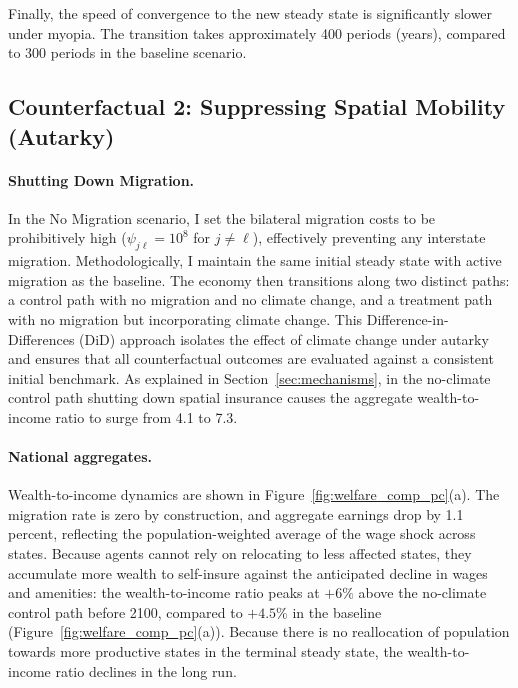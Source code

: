 \documentclass[11pt, a4paper]{article}
\begin{document}
Finally, the speed of convergence to the new steady state is significantly slower under myopia. The transition takes approximately 400 periods (years), compared to 300 periods in the baseline scenario.

\subsection{Counterfactual 2: Suppressing Spatial Mobility (Autarky)}
\label{sec:margins}

\paragraph{Shutting Down Migration.} In the No Migration scenario, I set the bilateral migration costs to be prohibitively high ($\psi_{j\ell} = 10^8$ for $j \neq \ell$), effectively preventing any interstate migration. Methodologically, I maintain the same initial steady state with active migration as the baseline. The economy then transitions along two distinct paths: a control path with no migration and no climate change, and a treatment path with no migration but incorporating climate change. This Difference-in-Differences (DiD) approach isolates the effect of climate change under autarky and ensures that all counterfactual outcomes are evaluated against a consistent initial benchmark. As explained in Section~\ref{sec:mechanisms}, in the no-climate control path shutting down spatial insurance causes the aggregate wealth-to-income ratio to surge from 4.1 to 7.3.


\paragraph{National aggregates.} Wealth-to-income dynamics are shown in Figure~\ref{fig:welfare_comp_pc}(a). The migration rate is zero by construction, and aggregate earnings drop by 1.1 percent, reflecting the population-weighted average of the wage shock across states. Because agents cannot rely on relocating to less affected states, they accumulate more wealth to self-insure against the anticipated decline in wages and amenities: the wealth-to-income ratio peaks at $+6\%$ above the no-climate control path before 2100, compared to $+4.5\%$ in the baseline (Figure~\ref{fig:welfare_comp_pc}(a)). Because there is no reallocation of population towards more productive states in the terminal steady state, the wealth-to-income ratio declines in the long run.
\end{document}
